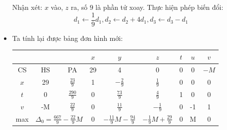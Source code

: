 \documentclass[12pt,a4paper]{article}
\begin{document}
\begin{itemize}
\begin{table}[H]
					\end{table}
					Nhận xét: $x$ vào, $z$ ra, số $9$ là phần tử xoay.
					Thực hiện phép biến đổi:
					\[d_1 \leftarrow \frac{1}{9}d_1, d_2 \leftarrow d_2 + 4d_1, d_3 \leftarrow d_3 - d_1\]
				\item Ta tính lại được bảng đơn hình mới:
					\begin{table}[H]
						\centering
						\setlength{\tabcolsep}{1.2em}
						{\renewcommand{\arraystretch}{1.5}\begin{tabular}{|ccc|c|c|c|c|c|c|}
						\hline
						\multicolumn{3}{|c|}{}                                                                                                          & \cellcolor[HTML]{B4C6E7}$x$ & \cellcolor[HTML]{B4C6E7}$y$                              & \cellcolor[HTML]{B4C6E7}$z$     & \cellcolor[HTML]{B4C6E7}$t$ & \cellcolor[HTML]{B4C6E7}$u$ & \cellcolor[HTML]{B4C6E7}$v$ \\ \hline
						\multicolumn{1}{|c|}{\cellcolor[HTML]{B4C6E7}CS} & \multicolumn{1}{c|}{\cellcolor[HTML]{B4C6E7}HS} & \cellcolor[HTML]{B4C6E7}PA & 29                          & 4                                                        & 0                               & 0                           & 0                           & $-M$                          \\ \hline
						\multicolumn{1}{|c|}{$x$}                        & \multicolumn{1}{c|}{29}                         & $\frac{23}{9}$             & 1                           & $-\frac{2}{9}$                                           & $\frac{1}{9}$                   & 0                           & 0                           & 0                           \\ \hline
						\multicolumn{1}{|c|}{$t$}                        & \multicolumn{1}{c|}{0}                          & $\frac{290}{9}$            & 0                           & $\frac{73}{9}$                                           & $\frac{4}{9}$                   & 1                           & 0                           & 0                           \\ \hline
						\multicolumn{1}{|c|}{$v$}                        & \multicolumn{1}{c|}{-M}                         & $\frac{22}{9}$             & 0                           & \cellcolor[HTML]{F4B084}$\frac{11}{9}$                   & $-\frac{1}{9}$                  & 0                           & -1                          & 1                           \\ \hline
						\multicolumn{1}{|c|}{max}                        & \multicolumn{2}{c|}{$\Delta_0 = \frac{667}{9} -   \frac{22}{9}M$}            & 0                           & \cellcolor[HTML]{F4B084}$-\frac{11}{9}M   -\frac{94}{9}$ & $-\frac{1}{9}M   +\frac{29}{9}$ & 0                           & M                           & 0                           \\ \hline

\end{tabular}}
\end{table}
\end{itemize}
\end{document}
